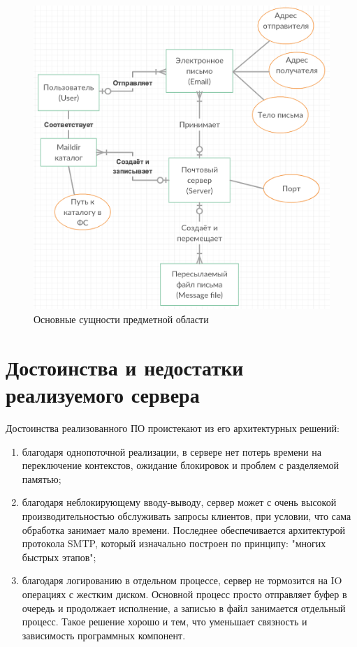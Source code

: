 \documentclass[a4paper,12pt]{report}
\begin{document}
\begin{figure}
\centering
\includegraphics[width=\textwidth]{diagramms/entities.png}
\caption{Основные сущности предметной области}
\label{fig:entities}
\end{figure}

\section{Достоинства и недостатки реализуемого сервера}

Достоинства реализованного ПО проистекают из его архитектурных решений:
\begin{enumerate}
    \item благодаря однопоточной реализации, в сервере нет потерь времени на переключение контекстов, ожидание блокировок и проблем с разделяемой памятью;
    \item благодаря неблокирующему вводу-выводу, сервер может с очень высокой производительностью обслуживать запросы клиентов, при условии, что сама обработка занимает мало времени. Последнее обеспечивается архитектурой протокола SMTP, который изначально построен по принципу: "многих быстрых этапов";
    \item благодаря логированию в отдельном процессе, сервер не тормозится на IO операциях с жестким диском. Основной процесс просто отправляет буфер в очередь и продолжает исполнение, а записью в файл занимается отдельный процесс. Такое решение хорошо и тем, что уменьшает связность и зависимость программных компонент.
\end{enumerate}
\end{document}
